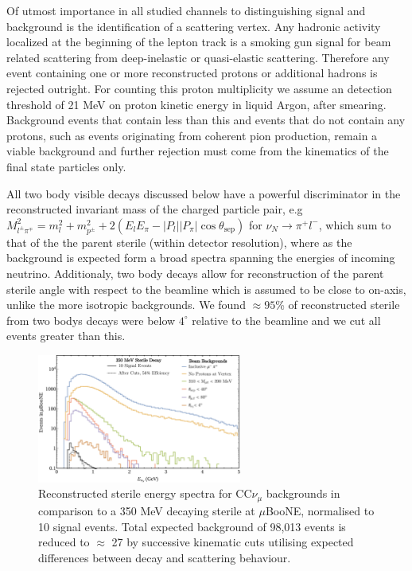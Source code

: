 \documentclass[11pt, a4paper]{article}
\begin{document}
Of utmost importance in all studied channels to distinguishing signal and background is the identification of a scattering vertex. Any hadronic activity localized at the beginning of the lepton track is a smoking gun signal for beam related scattering from deep-inelastic or quasi-elastic scattering. Therefore any event containing one or more reconstructed protons or additional hadrons is rejected outright. For counting this proton multiplicity we assume an detection threshold of 21 MeV on proton kinetic energy in liquid Argon, after smearing. Background events that contain less than this and events that do not contain any protons, such as events originating from coherent pion production, remain a viable background and further rejection must come from the kinematics of the final state particles only. 

All two body visible decays discussed below have a powerful discriminator in the reconstructed invariant mass of the charged particle pair, e.g  $M_{l^\pm \pi^\mp}^2=m_l^2+m_{p^\pm}^2+ 2(E_l E_\pi - |P_l||P_\pi|\cos\theta_\text{sep})$ for $\nu_N \rightarrow \pi^+ l^-$, which sum to that of the the parent sterile (within detector resolution), where as the background is expected form a broad spectra spanning the energies of incoming neutrino. Additionaly, two body decays allow for reconstruction of the parent sterile angle with respect to the beamline which is assumed to be close to on-axis, unlike the more isotropic backgrounds. We found $\approx 95$\% of reconstructed sterile from two bodys decays were below $4^\circ$ relative to the beamline and we cut all events greater than this.

\begin{figure}[h]
\center
\includegraphics[width=0.6\textwidth,clip,trim=0 0 0 0]{figures/mu_pi_cutflow.pdf}
\caption{\label{fig:mu_pi_cutflow} Reconstructed sterile energy spectra for CC$\nu_\mu$ backgrounds in comparison to a 350 MeV decaying sterile at $\mu$BooNE, normalised to 10 signal events. Total expected background of 98,013 events is reduced to $\approx$ 27 by successive kinematic cuts utilising expected differences between decay and scattering behaviour. }

\end{figure}
\end{document}
